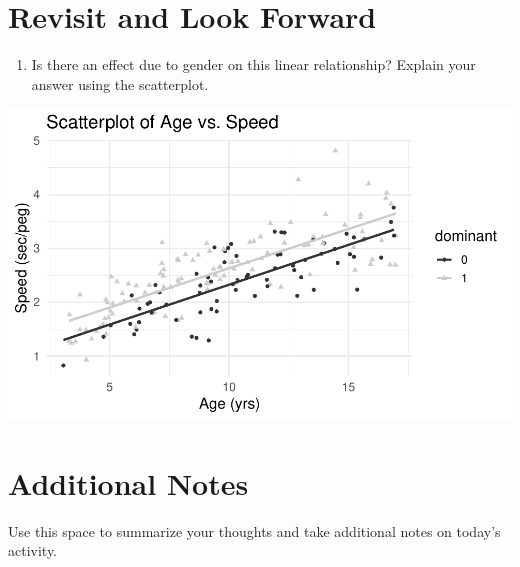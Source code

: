 \documentclass[
]{report}
\providecommand{\tightlist}{%
  \setlength{\itemsep}{0pt}\setlength{\parskip}{0pt}}
\begin{document}
\hypertarget{revisit-and-look-forward-3}{%
\section{Revisit and Look Forward}\label{revisit-and-look-forward-3}}

\begin{enumerate}
\def\labelenumi{\arabic{enumi}.}
\setcounter{enumi}{22}
\tightlist
\item
  Is there an effect due to gender on this linear relationship? Explain your answer using the scatterplot.
\end{enumerate}

\begin{center}\includegraphics[width=0.7\linewidth]{10-regression_files/figure-latex/unnamed-chunk-6-1} \end{center}

\hypertarget{additional-notes-9}{%
\section{Additional Notes}\label{additional-notes-9}}

Use this space to summarize your thoughts and take additional notes on today's activity.
\end{document}
